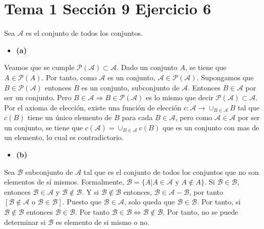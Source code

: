 \documentclass{article}
\begin{document}
\section{Tema 1 Sección 9 Ejercicio 6}
Sea $\mathcal{A}$ es el conjunto de todos los conjuntos.
\begin{itemize}
\item \bf (a) \rm
\end{itemize}
Veamos que se cumple $\mathcal{P}(\mathcal{A})\subset \mathcal{A}$.  Dado un conjunto $A$, se tiene que $A\in \mathcal{P}(A)$. Por tanto, como  $\mathcal{A}$ es un conjunto, $\mathcal{A}\in \mathcal{P}(\mathcal{A})$. Supongamos que $B\in\mathcal{P}(\mathcal{A})$ entonces $B$ es un conjunto, subconjunto de $\mathcal{A}$. Entonces $B\in \mathcal{A}$ por ser un conjunto. Pero $B\in \mathcal{A} \Rightarrow B\in \mathcal{P}(\mathcal{A})$ es lo mismo que decir $\mathcal{P}(\mathcal{A})\subset \mathcal{A}$.\newline
Por el axioma de elección, existe una función de elección $c:\mathcal{A}\rightarrow \cup_{B\in \mathcal{A}}B$ tal que $c(B)$ tiene un único elemento de $B$ para cada $B\in \mathcal{A}$, pero como $ \mathcal{A}\in \mathcal{A}$ por ser un conjunto, se tiene que $c(\mathcal{A})=\cup_{B\in \mathcal{A}}c(B)$ que es un conjunto con mas de un elemento, lo cual es contradictorio.
\begin{itemize}
\item \bf (b) \rm
\end{itemize}
Sea $\mathcal{B}$ subconjunto de $\mathcal{A}$ tal que es el conjunto de todos los conjuntos que no son elementos de sí mismos. Formalmente, $\mathcal{B}=\{A|A\in \mathcal{A} \text{ y }A\notin A\}$. Si $\mathcal{B}\in \mathcal{B}$, entonces $\mathcal{B}\in \mathcal{A}$ y $\mathcal{B}\notin \mathcal{B}$. Y si $\mathcal{B}\notin \mathcal{B}$ entonces, $\mathcal{B}\in \mathcal{A}-\mathcal{B}$, por tanto $[\mathcal{B}\notin \mathcal{A}\text{ o }\mathcal{B}\in \mathcal{B}]$. Puesto que $\mathcal{B}\in \mathcal{A}$, solo queda que $\mathcal{B}\in \mathcal{B}$. Por tanto, si $\mathcal{B}\notin \mathcal{B}$ entonces $\mathcal{B}\in \mathcal{B}$. Por tanto $\mathcal{B}\in \mathcal{B}\Leftrightarrow \mathcal{B}\notin \mathcal{B}$. Por tanto, no se puede determinar si $\mathcal{B}$ es elemento de si mismo o no.
\end{document}

